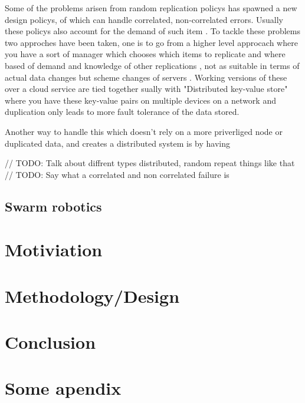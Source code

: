 \documentclass{UoYCSproject}
\begin{document}
Some of the problems arisen from random replication policys has spawned a new design policys, of which can handle correlated, non-correlated errors.
Usually these policys also account for the demand of such item \cite{Avalability storage, Distributed Storage}.
To tackle these problems two approches have been taken, one is to go from a higher level approcach where you have a sort of manager which chooses which items to replicate and where based of demand and knowledge of other replications \cite{Avalability storage, Patent}, not as suitable in terms of actual data changes but scheme changes of servers \cite{Scheme changes}.
Working versions of these over a cloud service are tied together sually with "Distributed key-value store"  \cite{Key-Value} where you have these key-value pairs on multiple devices on a network and duplication only leads to more fault tolerance of the data stored.

Another way to handle this which doesn't rely on a more priverliged node or duplicated data, and creates a distributed system is by having 

// TODO: Talk about diffrent types distributed, random repeat things like that 
// TODO: Say what a correlated and non correlated failure is

\section{Swarm robotics}
\label{sec:Robotics}



\chapter{Motiviation}
\label{cha:Motivation}


\chapter{Methodology/Design}
\label{cha:Methodology/Design}


\chapter{Conclusion}
\label{cha:conclusion}


\appendix
\chapter{Some apendix}
\end{document}
